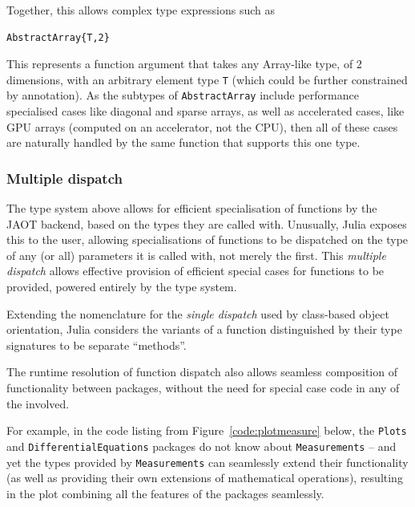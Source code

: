 \documentclass{webofc}
\begin{document}
Together, this allows complex type expressions such as

\begin{verbatim}
AbstractArray{T,2}
\end{verbatim}

This represents a function argument that takes any Array-like type, of 2
dimensions, with an arbitrary element type \texttt{T} (which could be further constrained
by annotation). As the subtypes of \verb$AbstractArray$ include performance
specialised cases like diagonal and sparse arrays, as well as accelerated cases, like
GPU arrays (computed on an accelerator, not the CPU), then all of these cases are
naturally handled by the same function that supports this one type. 

\subsubsection{Multiple dispatch}

The type system above allows for efficient specialisation of functions by the
JAOT backend, based on the types they are called with. Unusually, Julia exposes
this to the user, allowing specialisations of functions to be dispatched on the
type of any (or all) parameters it is called with, not merely the first. This
\textit{multiple dispatch} allows effective provision of efficient special cases
for functions to be provided, powered entirely by the type system.

Extending the nomenclature for the \textit{single dispatch} used by
class-based object orientation, Julia considers the variants of a function
distinguished by their type signatures to be separate ``methods''.

The runtime resolution of function dispatch also allows seamless composition
of functionality between packages, without the need for special case
code in any of the involved.

For example, in the code listing from Figure~\ref{code:plotmeasure} below, the
\texttt{Plots} and \texttt{DifferentialEquations} packages do not know about
\texttt{Measurements} -- and yet the types provided by \texttt{Measurements} can
seamlessly extend their functionality (as well as providing their own extensions
of mathematical operations), resulting in the plot combining all the features of
the packages seamlessly.
\end{document}
